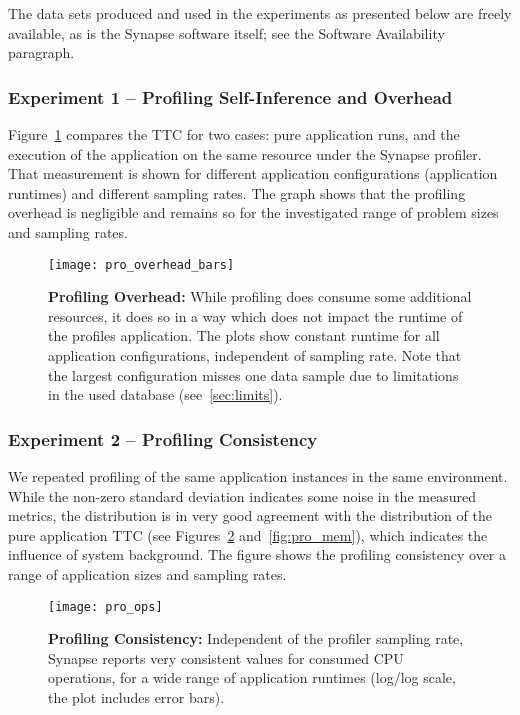 \documentclass[10pt, conference, compsocconf]{IEEEtran}
\newcommand{\synapse}{Synapse\xspace}
\begin{document}
 The data sets produced and used in the experiments as presented below
 are freely available, as is the \synapse software itself; see the
 Software Availability paragraph.

 \setcounter{subsubsection}{0}
 \subsubsection*{Experiment 1 -- Profiling Self-Inference and Overhead}

 Figure~\ref{fig:pro_overhead} compares the TTC for two cases: pure
 application runs, and the execution of the application on the
 same resource under the \synapse profiler.  That measurement is shown
 for different application configurations (application runtimes) and
 different sampling rates.  The graph shows that the profiling overhead
 is negligible and remains so for the
 investigated range of problem sizes and sampling rates.

 \begin{figure}[t]
   \centering
   \texttt{[image: pro\_overhead\_bars]}
   \caption{\textbf{Profiling Overhead:} While profiling does consume
       some additional resources, it does so in a way which does not
       impact the runtime of the profiles application.  The plots show
       constant runtime for all application configurations,
       independent of sampling rate. Note that the largest
       configuration misses one data sample due to limitations in the
       used database (see~\ref{sec:limits}).
     \label{fig:pro_overhead} 
   } 
   \end{figure}


 \subsubsection*{Experiment 2 -- Profiling Consistency}

 We repeated profiling of the same application instances in the same
 environment.  While the non-zero standard deviation indicates some
 noise in the measured metrics, the distribution is in very good
 agreement with the distribution of the pure application TTC (see
 Figures~\ref{fig:pro_ops} and~\ref{fig:pro_mem}), which indicates the
 influence of system background.  The figure shows the profiling
 consistency over a range of application sizes and sampling rates.

 \begin{figure}[t]
   \centering
   \texttt{[image: pro\_ops]}
   \caption{\textbf{Profiling Consistency:} Independent of the
       profiler sampling rate, \synapse reports very consistent
       values for consumed CPU operations, for a wide range of
       application runtimes (log/log scale, the plot includes
       error bars).
     \label{fig:pro_ops} 
   } 
   \end{figure}
\end{document}
